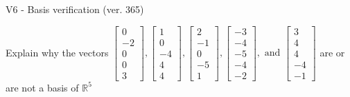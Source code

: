 \begin{exercise}
  \begin{exerciseTitle}V6 - Basis verification (ver. 365)\end{exerciseTitle}
  \begin{exerciseStatement}
    Explain why the vectors \(\left[\begin{array}{r}
0 \\
-2 \\
0 \\
0 \\
3
\end{array}\right] , \left[\begin{array}{r}
1 \\
0 \\
-4 \\
4 \\
4
\end{array}\right] , \left[\begin{array}{r}
2 \\
-1 \\
0 \\
-5 \\
1
\end{array}\right] , \left[\begin{array}{r}
-3 \\
-4 \\
-5 \\
-4 \\
-2
\end{array}\right] , \text{ and } \left[\begin{array}{r}
3 \\
4 \\
4 \\
-4 \\
-1
\end{array}\right]\) are or are not a basis of \(\mathbb{R}^5\)	



\end{exerciseStatement}
\end{exercise}
